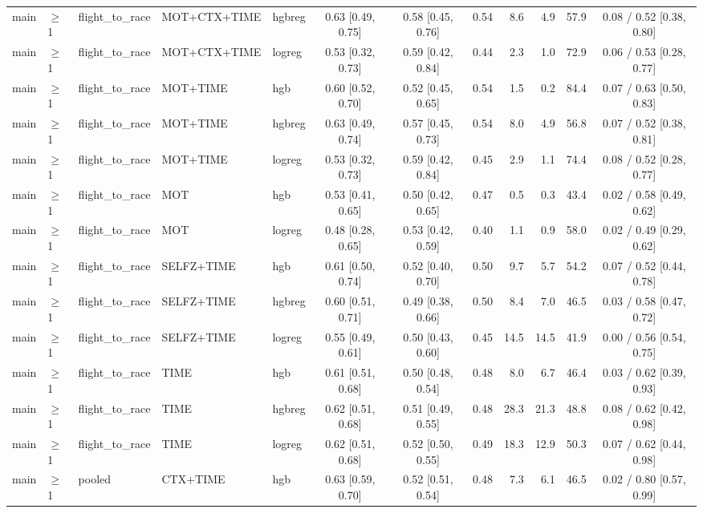 \begin{longtable}{@{}lllllcccrrrc@{}}
main & $\geq$1 & flight\_to\_race & MOT+CTX+TIME & hgbreg & 0.63 [0.49, 0.75] & 0.58 [0.45, 0.76] & 0.54 & 8.6 & 4.9 & 57.9 & 0.08 / 0.52 [0.38, 0.80] \\
main & $\geq$1 & flight\_to\_race & MOT+CTX+TIME & logreg & 0.53 [0.32, 0.73] & 0.59 [0.42, 0.84] & 0.44 & 2.3 & 1.0 & 72.9 & 0.06 / 0.53 [0.28, 0.77] \\
main & $\geq$1 & flight\_to\_race & MOT+TIME & hgb & 0.60 [0.52, 0.70] & 0.52 [0.45, 0.65] & 0.54 & 1.5 & 0.2 & 84.4 & 0.07 / 0.63 [0.50, 0.83] \\
main & $\geq$1 & flight\_to\_race & MOT+TIME & hgbreg & 0.63 [0.49, 0.74] & 0.57 [0.45, 0.73] & 0.54 & 8.0 & 4.9 & 56.8 & 0.07 / 0.52 [0.38, 0.81] \\
main & $\geq$1 & flight\_to\_race & MOT+TIME & logreg & 0.53 [0.32, 0.73] & 0.59 [0.42, 0.84] & 0.45 & 2.9 & 1.1 & 74.4 & 0.08 / 0.52 [0.28, 0.77] \\
main & $\geq$1 & flight\_to\_race & MOT & hgb & 0.53 [0.41, 0.65] & 0.50 [0.42, 0.65] & 0.47 & 0.5 & 0.3 & 43.4 & 0.02 / 0.58 [0.49, 0.62] \\
main & $\geq$1 & flight\_to\_race & MOT & logreg & 0.48 [0.28, 0.65] & 0.53 [0.42, 0.59] & 0.40 & 1.1 & 0.9 & 58.0 & 0.02 / 0.49 [0.29, 0.62] \\
main & $\geq$1 & flight\_to\_race & SELFZ+TIME & hgb & 0.61 [0.50, 0.74] & 0.52 [0.40, 0.70] & 0.50 & 9.7 & 5.7 & 54.2 & 0.07 / 0.52 [0.44, 0.78] \\
main & $\geq$1 & flight\_to\_race & SELFZ+TIME & hgbreg & 0.60 [0.51, 0.71] & 0.49 [0.38, 0.66] & 0.50 & 8.4 & 7.0 & 46.5 & 0.03 / 0.58 [0.47, 0.72] \\
main & $\geq$1 & flight\_to\_race & SELFZ+TIME & logreg & 0.55 [0.49, 0.61] & 0.50 [0.43, 0.60] & 0.45 & 14.5 & 14.5 & 41.9 & 0.00 / 0.56 [0.54, 0.75] \\
main & $\geq$1 & flight\_to\_race & TIME & hgb & 0.61 [0.51, 0.68] & 0.50 [0.48, 0.54] & 0.48 & 8.0 & 6.7 & 46.4 & 0.03 / 0.62 [0.39, 0.93] \\
main & $\geq$1 & flight\_to\_race & TIME & hgbreg & 0.62 [0.51, 0.68] & 0.51 [0.49, 0.55] & 0.48 & 28.3 & 21.3 & 48.8 & 0.08 / 0.62 [0.42, 0.98] \\
main & $\geq$1 & flight\_to\_race & TIME & logreg & 0.62 [0.51, 0.68] & 0.52 [0.50, 0.55] & 0.49 & 18.3 & 12.9 & 50.3 & 0.07 / 0.62 [0.44, 0.98] \\
main & $\geq$1 & pooled & CTX+TIME & hgb & 0.63 [0.59, 0.70] & 0.52 [0.51, 0.54] & 0.48 & 7.3 & 6.1 & 46.5 & 0.02 / 0.80 [0.57, 0.99] \\

\end{longtable}
